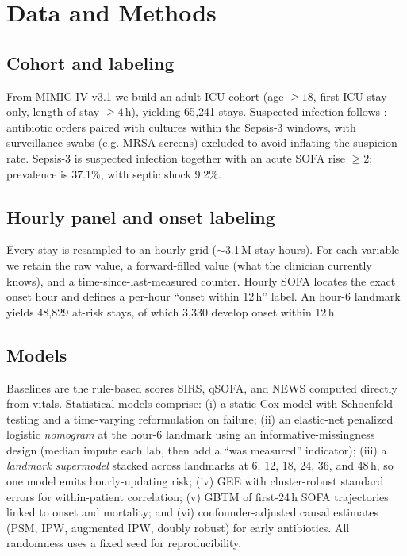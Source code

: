 \documentclass[conference]{IEEEtran}
\begin{document}
\section{Data and Methods}
\label{sec:methods}

\subsection{Cohort and labeling}
From MIMIC-IV v3.1 we build an adult ICU cohort (age $\ge 18$, first ICU stay
only, length of stay $\ge 4$\,h), yielding 65{,}241 stays. Suspected infection
follows \textcite{seymour2016criteria}: antibiotic orders
paired with cultures within the Sepsis-3 windows, with surveillance swabs (e.g.
MRSA screens) excluded to avoid inflating the suspicion rate. Sepsis-3 is
suspected infection together with an acute SOFA rise $\ge 2$; prevalence is
37.1\%, with septic shock 9.2\%.

\subsection{Hourly panel and onset labeling}
Every stay is resampled to an hourly grid ($\sim$3.1\,M stay-hours). For each
variable we retain the raw value, a forward-filled value (what the clinician
currently knows), and a time-since-last-measured counter. Hourly SOFA locates
the exact onset hour and defines a per-hour ``onset within 12\,h'' label. An
hour-6 landmark yields 48{,}829 at-risk stays, of which 3{,}330 develop onset
within 12\,h.

\subsection{Models}
Baselines are the rule-based scores SIRS, qSOFA, and NEWS computed directly
from vitals. Statistical models comprise: (i) a static Cox model with Schoenfeld
testing and a time-varying reformulation on failure; (ii) an elastic-net
penalized logistic \emph{nomogram} at the hour-6 landmark using an
informative-missingness design (median impute each lab, then add a ``was
measured'' indicator); (iii) a \emph{landmark supermodel} stacked across
landmarks at 6, 12, 18, 24, 36, and 48\,h, so one model emits hourly-updating
risk; (iv) GEE with cluster-robust standard errors for within-patient
correlation; (v) GBTM of first-24\,h SOFA trajectories linked to onset and
mortality; and (vi) confounder-adjusted causal estimates (PSM, IPW, augmented
IPW, doubly robust) for early antibiotics. All randomness uses a fixed seed for
reproducibility.
\end{document}
